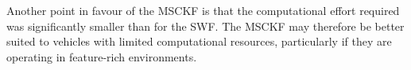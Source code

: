 \documentclass[letterpaper, 10 pt, conference]{ieeeconf}  %
\newcommand\T{\rule{0pt}{2.6ex}}        %
\newcommand\B{\rule[-1.2ex]{0pt}{0pt}} %
\begin{document}
Another point in favour of the MSCKF is that the computational effort required was significantly smaller than for the SWF.
The MSCKF may therefore be better suited to vehicles with limited computational resources, particularly if they are operating in feature-rich environments.


\end{document}
